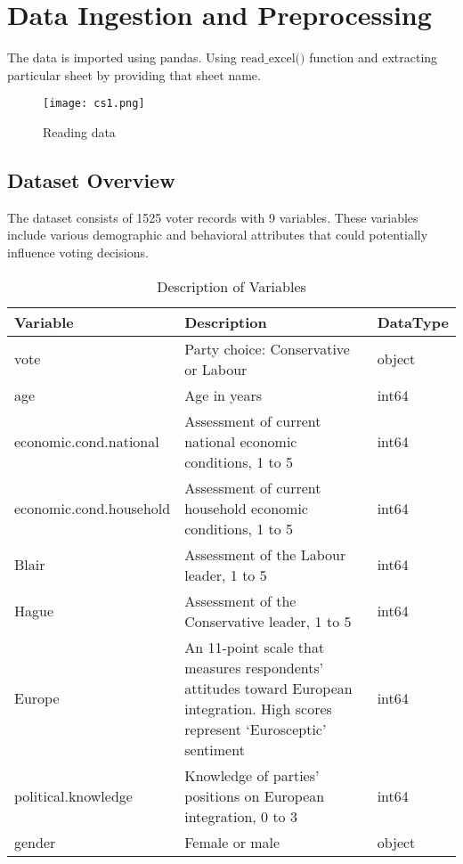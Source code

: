 \documentclass[12pt]{article}
\begin{document}
\section{Data Ingestion and Preprocessing}

The data is imported using pandas. Using $\text{read\_excel()}$ function and extracting particular sheet by providing that sheet name.

\begin{figure}[h]
    \centering
    \texttt{[image: cs1.png]}
    \caption{Reading data}
    \label{fig:example}
\end{figure}


\subsection{Dataset Overview}
The dataset consists of 1525 voter records with 9 variables. These variables include various demographic and behavioral attributes that could potentially influence voting decisions.

\begin{table}[H]
\centering
\caption{Description of Variables}
\label{tab:variable_description}
\begin{tabular}{l p{8cm} l}
\toprule
\textbf{Variable} & \textbf{Description} & \textbf{DataType}\\
\midrule
vote & Party choice: Conservative or Labour & object\\
age & Age in years & int64\\
economic.cond.national & Assessment of current national economic conditions, 1 to 5  & int64\\
economic.cond.household & Assessment of current household economic conditions, 1 to 5 & int64 \\
Blair & Assessment of the Labour leader, 1 to 5 & int64\\
Hague & Assessment of the Conservative leader, 1 to 5  & int64\\
Europe & An 11-point scale that measures respondents' attitudes toward European integration. High scores represent ‘Eurosceptic’ sentiment & int64\\
political.knowledge & Knowledge of parties' positions on European integration, 0 to 3  & int64\\
gender & Female or male  & object\\
\bottomrule
\end{tabular}
\end{table}
\end{document}
